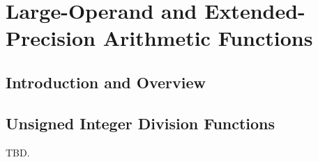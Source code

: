 
\chapter[Large-Operand and Extended-Precision Arithmetic Functions]
        {Large-Operand and Extended-Precision Arithmetic Functions}


\label{claf0}

\section{Introduction and Overview}
\label{claf0:siov0}


\section{Unsigned Integer Division Functions}
\label{claf0:suid0}

TBD.


